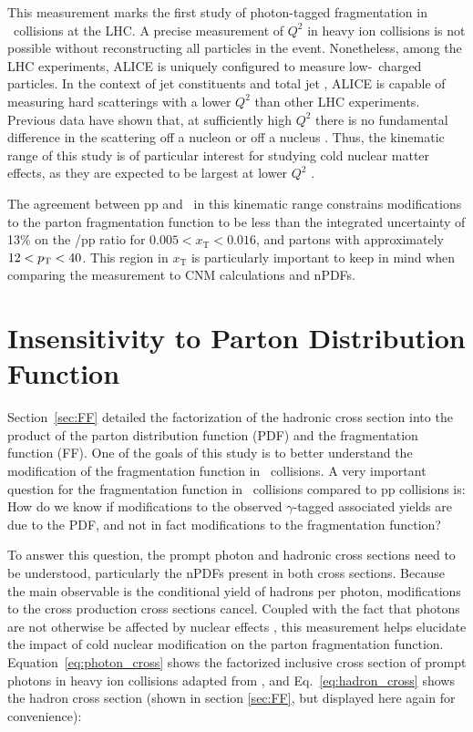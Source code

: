 This measurement marks the first study of photon-tagged fragmentation in \pPb~collisions at the LHC. A precise measurement of $Q^2$ in heavy ion collisions is not possible without reconstructing all particles in the event. Nonetheless, among the LHC experiments, ALICE is uniquely configured to measure low-\pt~charged particles. In the context of jet constituents and total jet \pt, ALICE is capable of measuring hard scatterings with a lower $Q^{2}$ than other LHC experiments. Previous data have shown that, at sufficiently high $Q^2$ there is no fundamental difference in the scattering off a nucleon or off a nucleus \cite{epps16:2017,ALTARELLI1977298}. Thus, the kinematic range of this study is of particular interest for studying cold nuclear matter effects, as they are expected to be largest at lower $Q^{2}$ \cite{epps16:2017}. 

The agreement between pp and \pPb~in this kinematic range constrains modifications to the parton fragmentation function to be less than the integrated uncertainty of 13\% on the \pPb/pp ratio for $ 0.005 < x_{\mathrm{T}} < 0.016$, and partons with approximately $12 < p_{\mathrm{T}} < 40$\GeVc. This region in $x_\mathrm{T}$ is particularly important to keep in mind when comparing the measurement to CNM calculations and nPDFs.

\section{Insensitivity to Parton Distribution Function}
\label{sec:insensitivity}
Section~\ref{sec:FF} detailed the factorization of the hadronic cross section into the product of the parton distribution function (PDF) and the fragmentation function (FF). One of the goals of this study is to better understand the modification of the fragmentation function in \pPb~collisions. A very important question for the fragmentation function in \pPb~collisions compared to pp collisions is: How do we know if modifications to the observed $\gamma$-tagged associated yields are due to the PDF, and not in fact modifications to the fragmentation function?

To answer this question, the prompt photon and hadronic cross sections need to be understood, particularly the nPDFs present in both cross sections. Because the main observable is the conditional yield of hadrons per photon, modifications to the cross production cross sections cancel. Coupled with the fact that photons are not otherwise be affected by nuclear effects \cite{Chatrchyan2012}, this measurement helps elucidate the impact of cold nuclear modification on the parton fragmentation function. Equation~\ref{eq:photon_cross} shows the factorized inclusive cross section of prompt photons in heavy ion collisions adapted from \cite{Catani2002}, and Eq.~\ref{eq:hadron_cross} shows the hadron cross section (shown in section \ref{sec:FF}, but displayed here again for convenience):



